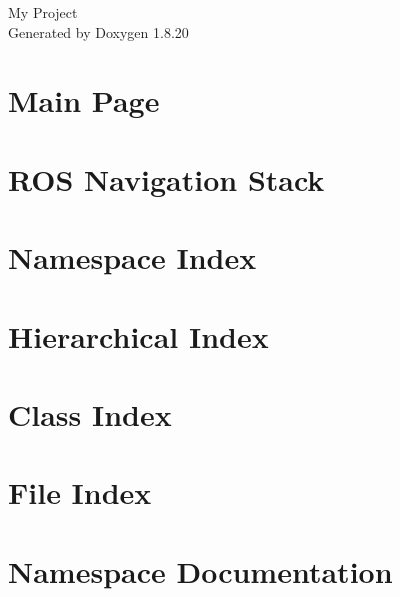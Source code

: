 \let\mypdfximage\pdfximage\def\pdfximage{\immediate\mypdfximage}\documentclass[twoside]{book}
\newcommand{\+}{\discretionary{\mbox{\scriptsize$\hookleftarrow$}}{}{}}
\newcommand{\clearemptydoublepage}{%
  \newpage{\pagestyle{empty}\cleardoublepage}%
}
\begin{document}
\hypersetup{pageanchor=false,
             bookmarksnumbered=true,
             pdfencoding=unicode
            }
\begin{titlepage}
\vspace*{7cm}
\begin{center}%
{\Large My Project }\\
\vspace*{1cm}
{\large Generated by Doxygen 1.8.20}\\
\end{center}
\end{titlepage}
\clearemptydoublepage
{}
\tableofcontents
\clearemptydoublepage
{}
\hypersetup{pageanchor=true}

\chapter{Main Page}
\label{index}\hypertarget{index}{}
\chapter{R\+OS Navigation Stack}
\label{md__e__github_navigation__r_e_a_d_m_e}

\chapter{Namespace Index}

\chapter{Hierarchical Index}

\chapter{Class Index}

\chapter{File Index}

\chapter{Namespace Documentation}




















\end{document}
